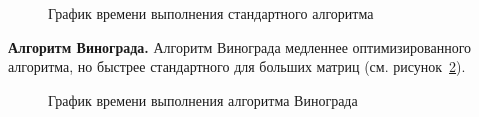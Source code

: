 \begin{figure}[H]
	\caption{График времени выполнения стандартного алгоритма}
	\label{pic_standard}
\end{figure}

\textbf{Алгоритм Винограда.}  
Алгоритм Винограда медленнее оптимизированного алгоритма, но быстрее стандартного для больших матриц (см. рисунок~\ref{pic_vinograd}).

\begin{figure}[H]
	\caption{График времени выполнения алгоритма Винограда}
	\label{pic_vinograd}
\end{figure}

